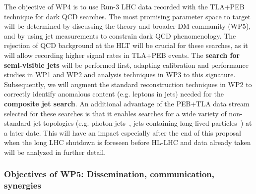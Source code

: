 The objective of WP4 is to use Run-3 LHC data recorded with the TLA+PEB technique for dark QCD searches. 
The most promising parameter space to target will be determined by discussing the theory and broader DM community (WP5), and by using jet measurements to constrain dark QCD phenomenology. 
The rejection of QCD background at the HLT will be crucial for these searches, as it will allow recording higher signal rates in TLA+PEB events. 
The \textbf{search for semi-visible jets} will be performed first, adapting calibration and performance studies in WP1 and WP2 and analysis techniques in WP3 to this signature. 
Subsequently, we will augment the standard reconstruction techniques in WP2 to correctly identify anomalous content (e.g. leptons in jets) needed for the \textbf{composite jet search}.
An additional advantage of the PEB+TLA data stream selected for these searches is that it enables searches for a wide variety of non-standard jet topologies (e.g. photon-jets~\cite{ToBeCited}, %
jets containing long-lived particles~\cite{ToBeCited}) %
at a later date. 
This will have an impact especially after the end of this proposal when the long LHC shutdown is foreseen before HL-LHC and data already taken will be analyzed in further detail. 

\subsubsection{Objectives of WP5: Dissemination, communication, synergies}


